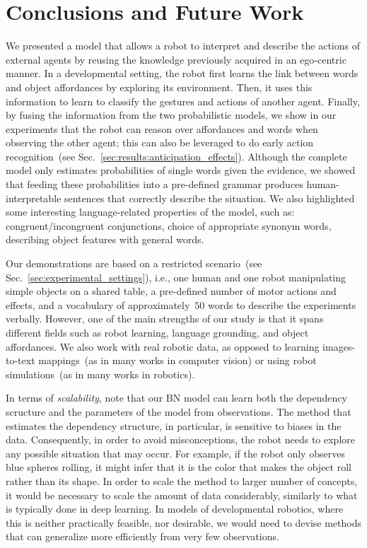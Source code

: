 
\section{Conclusions and Future Work}
\label{sec:conclusions}

We presented a model that allows a robot to interpret and describe the actions of external agents by reusing the knowledge previously acquired in an ego-centric manner.
In a developmental setting, the robot first learns the link between words and object affordances by exploring its environment.
Then, it uses this information to learn to classify the gestures and actions of another agent.
Finally, by fusing the information from the two probabilistic models, we show in our experiments that the robot can reason over affordances and words when observing the other agent; this can also be leveraged to do early action recognition~(see Sec.~\ref{sec:results:anticipation_effects}).
Although the complete model only estimates probabilities of single words given the evidence, we showed that feeding these probabilities into a pre-defined grammar produces human-interpretable sentences that correctly describe the situation.
We also highlighted some interesting language-related properties of the model, such as:
congruent/incongruent conjunctions,
choice of appropriate synonym words,
describing object features with general words.

Our demonstrations are based on a restricted scenario~(see Sec.~\ref{sec:experimental_settings}), i.e., one human and one robot manipulating simple objects on a shared table, a pre-defined number of motor actions and effects, and a vocabulary of approximately~$50$ words to describe the experiments verbally.
However, one of the main strengths of our study is that it spans different fields such as robot learning, language grounding, and object affordances.
We also work with real robotic data, as opposed to learning images-to-text mappings~(as in many works in computer vision) or using robot simulations~(as in many works in robotics).

In terms of \emph{scalability}, note that our \ac{BN} model can learn both the dependency scructure and the parameters of the model from observations.
The method that estimates the dependency structure, in particular, is sensitive to biases in the data.
Consequently, in order to avoid misconceptions, the robot needs to explore any possible situation that may occur.
For example, if the robot only observes blue spheres rolling, it might infer that it is the color that makes the object roll rather than its shape.
In order to scale the method to larger number of concepts, it would be necessary to scale the amount of data considerably, similarly to what is typically done in deep learning.
In models of developmental robotics, where this is neither practically feasible, nor desirable, we would need to devise methods that can generalize more efficiently from very few observations.

